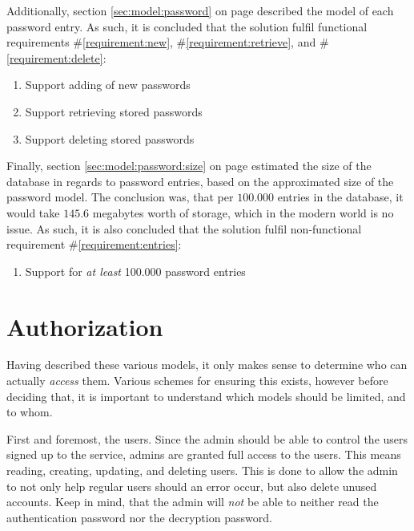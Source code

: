 			Additionally, section \ref{sec:model:password} on page \pageref{sec:model:password} described the model of each password entry. As such, it is concluded that the solution fulfil functional requirements \#\ref{requirement:new}, \#\ref{requirement:retrieve}, and \#\ref{requirement:delete}:
			\vspace{-3ex}\begin{enumerate}
				\setlength\itemsep{0.1em}
				\setcounter{enumi}{10-1}
				\item Support adding of new passwords
				\item Support retrieving stored passwords
				\item Support deleting stored passwords
			\end{enumerate}

			Finally, section \ref{sec:model:password:size} on page \pageref{sec:model:password:size} estimated the size of the database in regards to password entries, based on the approximated size of the password model. The conclusion was, that per $100.000$ entries in the database, it would take $145.6$ megabytes worth of storage, which in the modern world is no issue. As such, it is also concluded that the solution fulfil non-functional requirement \#\ref{requirement:entries}:
			\vspace{-3ex}\begin{enumerate}
				\setlength\itemsep{0.1em}
				\setcounter{enumi}{3-1}
				\item Support for \emph{at least} 100.000 password entries
			\end{enumerate}

	\section{Authorization}
		\label{sec:design:authorization}
		Having described these various models, it only makes sense to determine who can actually \emph{access} them. Various schemes for ensuring this exists, however before deciding that, it is important to understand which models should be limited, and to whom.

		First and foremost, the users. Since the admin should be able to control the users signed up to the service, admins are granted full access to the users. This means reading, creating, updating, and deleting users. This is done to allow the admin to not only help regular users should an error occur, but also delete unused accounts. Keep in mind, that the admin will \emph{not} be able to neither read the authentication password nor the decryption password.

